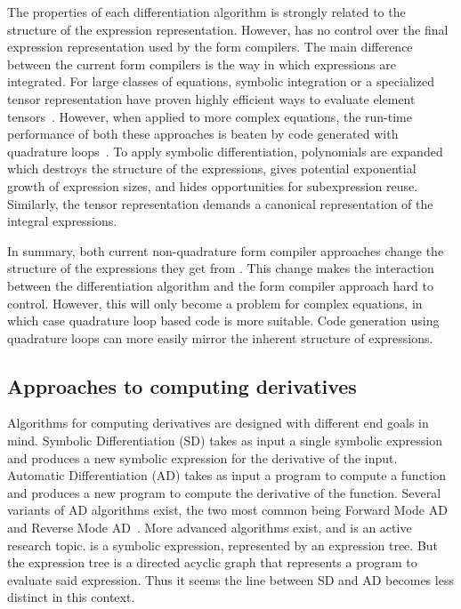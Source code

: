 The properties of each differentiation algorithm is strongly related
to the structure of the expression representation.  However, \ufl{}
has no control over the final expression representation used by the
form compilers.  The main difference between the current form
compilers is the way in which expressions are integrated.  For large
classes of equations, symbolic integration or a specialized tensor
representation have proven highly efficient ways to evaluate element
tensors~\cite{AlnMar2009,KirLog2006,KirLog2007}.  However, when
applied to more complex equations, the run-time performance of both
these approaches is beaten by code generated with quadrature
loops~\cite{AlnMar2009,OelWel2009}.  To apply symbolic
differentiation, polynomials are expanded which destroys the structure
of the expressions, gives potential exponential growth of expression
sizes, and hides opportunities for subexpression reuse.  Similarly,
the tensor representation demands a canonical representation of the
integral expressions.

In summary, both current non-quadrature form compiler approaches
change the structure of the expressions they get from \ufl{}.  This
change makes the interaction between the differentiation algorithm and
the form compiler approach hard to control.  However, this will only
become a problem for complex equations, in which case quadrature loop
based code is more suitable.  Code generation using quadrature loops
can more easily mirror the inherent structure of \ufl{} expressions.

\subsection{Approaches to computing derivatives} \label{ufl:sec:appcompder}

Algorithms for computing derivatives are designed with different end
goals in mind.  Symbolic Differentiation (SD) takes as input a single
symbolic expression and produces a new symbolic expression for the
derivative of the input.  Automatic Differentiation (AD) takes as
input a program to compute a function and produces a new program to
compute the derivative of the function.  Several variants of AD
algorithms exist, the two most common being Forward Mode AD and
Reverse Mode AD~\cite{Gri1989}.  More advanced algorithms exist, and
is an active research topic.%
is a symbolic expression, represented by an expression tree. But the
expression tree is a directed acyclic graph that represents a program
to evaluate said expression.  Thus it seems the line between SD and AD
becomes less distinct in this context.

